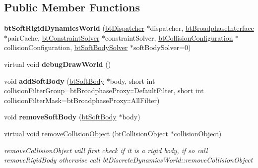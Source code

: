 \subsection*{Public Member Functions}
\begin{DoxyCompactItemize}
\item 
\mbox{\label{classbtSoftRigidDynamicsWorld_ad3724ef1193391fe522edc96c541ac9c}} 
{\bfseries bt\+Soft\+Rigid\+Dynamics\+World} (\hyperlink{classbtDispatcher}{bt\+Dispatcher} $\ast$dispatcher, \hyperlink{classbtBroadphaseInterface}{bt\+Broadphase\+Interface} $\ast$pair\+Cache, \hyperlink{classbtConstraintSolver}{bt\+Constraint\+Solver} $\ast$constraint\+Solver, \hyperlink{classbtCollisionConfiguration}{bt\+Collision\+Configuration} $\ast$collision\+Configuration, \hyperlink{classbtSoftBodySolver}{bt\+Soft\+Body\+Solver} $\ast$soft\+Body\+Solver=0)
\item 
\mbox{\label{classbtSoftRigidDynamicsWorld_a4f4f35e55b213306488d9b57a30271a3}} 
virtual void {\bfseries debug\+Draw\+World} ()
\item 
\mbox{\label{classbtSoftRigidDynamicsWorld_aa20faacb10b1d67a6b79e19a3709da65}} 
void {\bfseries add\+Soft\+Body} (\hyperlink{classbtSoftBody}{bt\+Soft\+Body} $\ast$body, short int collision\+Filter\+Group=bt\+Broadphase\+Proxy\+::\+Default\+Filter, short int collision\+Filter\+Mask=bt\+Broadphase\+Proxy\+::\+All\+Filter)
\item 
\mbox{\label{classbtSoftRigidDynamicsWorld_a4129564060bc4960f509ebf31470686a}} 
void {\bfseries remove\+Soft\+Body} (\hyperlink{classbtSoftBody}{bt\+Soft\+Body} $\ast$body)
\item 
\mbox{\label{classbtSoftRigidDynamicsWorld_af2b8c217f386bb37cab6512294281c7e}} 
virtual void \hyperlink{classbtSoftRigidDynamicsWorld_af2b8c217f386bb37cab6512294281c7e}{remove\+Collision\+Object} (bt\+Collision\+Object $\ast$collision\+Object)
\begin{DoxyCompactList}\small\item\em remove\+Collision\+Object will first check if it is a rigid body, if so call remove\+Rigid\+Body otherwise call bt\+Discrete\+Dynamics\+World\+::remove\+Collision\+Object \end{DoxyCompactList}\item 

\end{DoxyCompactItemize}
